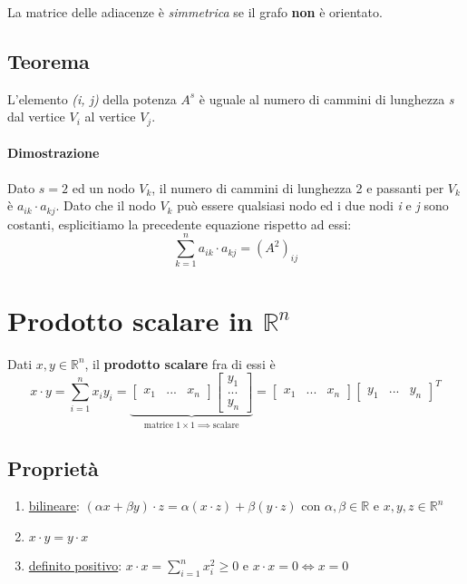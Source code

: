 		La matrice delle adiacenze è \textit{simmetrica} se il grafo \textbf{non} è orientato.
		
		\subsection{Teorema}
			L'elemento \textit{(i, j)} della potenza $ A^{s} $ è uguale al numero di cammini di lunghezza \textit{s} dal vertice $V_i$ al vertice $V_j$.
			
			\begin{GrayBox}
				\paragraph{Dimostrazione}
				Dato $ s = 2 $ ed un nodo $V_k$, il numero di cammini di lunghezza 2 e passanti per $V_k$ è $a_{ik} \cdot a_{kj}$.
				Dato che il nodo $V_k$ può essere qualsiasi nodo ed i due nodi \textit{i} e \textit{j} sono costanti, esplicitiamo la precedente equazione rispetto ad essi:
				$$ \sum_{k=1}^n a_{ik} \cdot a_{kj} = (A^2)_{ij} $$
			\end{GrayBox}
	
	\section{Prodotto scalare in $\mathbb{R}^n$}
		Dati $x,y \in \mathbb{R}^n $, il \textbf{prodotto scalare} fra di essi è
		$$ 
		x \cdot y = \sum_{i=1}^n x_iy_i =
		\underbrace{
			\begin{bmatrix}
				x_1 & ... & x_n
			\end{bmatrix}
			\begin{bmatrix}
				y_1 \\
				... \\
				y_n
			\end{bmatrix}
		}_{\text{matrice } 1 \times 1 \implies \text{scalare}}
		=
		\begin{bmatrix}
			x_1 & ... & x_n
		\end{bmatrix}
		\begin{bmatrix}
			y_1 & ... & y_n
		\end{bmatrix}^T
		$$
		
		\subsection{Proprietà}
			\begin{enumerate}
				\item \underline{bilineare}: $ (\alpha x + \beta y) \cdot z = \alpha (x \cdot z) + \beta (y \cdot z)  $ con $ \alpha, \beta \in \mathbb{R} $ e $ x, y, z \in \mathbb{R}^n $
				\item $ x \cdot y = y \cdot x $
				\item \underline{definito positivo}: $ x \cdot x = \sum_{i=1}^n x^2_i \geq 0 $ e $ x \cdot x = 0 \iff x = 0 $
			\end{enumerate}
		
